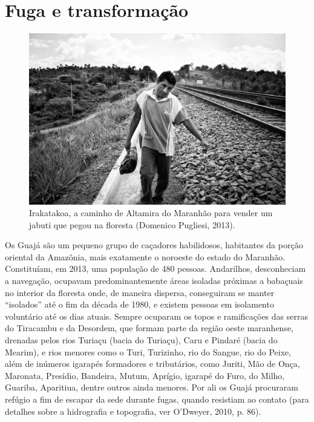 
\chapter{Fuga e transformação}\label{fuga-e-transformauxe7uxe3o}

\begin{figure}[H]
\centering
  \includegraphics[width=\textwidth]{./imgs/Irakatakoa_426}
\caption{Irakatakoa, a caminho de Altamira do Maranhão para vender um jabuti que pegou na
floresta (Domenico Pugliesi, 2013).}
\end{figure}

\noindent Os Guajá são um pequeno grupo de caçadores habilidosos, habitantes da
porção oriental da Amazônia, mais exatamente o noroeste do estado do
Maranhão. Constituíam, em 2013, uma população de 480 pessoas. Andarilhos, desconheciam a navegação, ocupavam
predominantemente áreas isoladas próximas a babaçuais no interior da
floresta onde, de maneira dispersa, conseguiram se manter ``isolados''
até o fim da década de 1980, e existem pessoas em isolamento voluntário
até os dias atuais. Sempre ocuparam os topos e ramificações das serras
do Tiracambu e da Desordem, que formam parte da região oeste maranhense,
drenadas pelos rios Turiaçu (bacia do Turiaçu), Caru e Pindaré (bacia do
Mearim), e rios menores como o Turi, Turizinho, rio do Sangue, rio do
Peixe, além de inúmeros igarapés formadores e tributários, como Juriti,
Mão de Onça, Maronata, Presídio, Bandeira, Mutum, Aprígio, igarapé do
Furo, do Milho, Guariba, Aparitiua, dentre outros ainda menores. Por ali
os Guajá procuraram refúgio a fim de escapar da sede durante fugas,
quando resistiam ao contato (para detalhes sobre a hidrografia e
topografia, ver O'Dweyer, 2010, p. 86).

